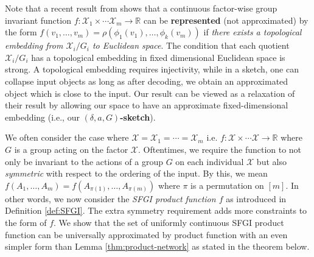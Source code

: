 \documentclass[12pt]{article}
\newcommand{\R}{\mathbb R}
\newcommand{\samedit}[1]{{{\textcolor{darkblue}{#1}}}}
\newcommand{\SFGI} {{SFGI}}
\begin{document}
Note that a recent result from \citep{lim2022sign} shows that a continuous factor-wise group invariant function $f: \mathcal{X}_1 \times \cdots \mathcal{X}_m \to \R$ can be {\bf represented} (not approximated) by the form $f(v_1, \dots, v_m) = \rho(\phi_1(v_1), \dots, \phi_k(v_m))$ if \emph{there exists a topological embedding from $\mathcal{X}_i/G_i$ to Euclidean space}. The condition that each quotient $\mathcal{X}_i/G_i$ has a topological embedding in fixed dimensional Euclidean space is strong. A topological embedding requires injectivity, while in a sketch, one can collapse input objects as long as after decoding, we obtain an approximated object which is close to the input.
Our result can be viewed as a relaxation of their result by allowing our space to have an approximate fixed-dimensional embedding (i.e., our {\bf $(\delta, a, G)$-sketch}). 

We often consider the case where $\mathcal{X} = \mathcal{X}_1 =  \cdots = \mathcal{X}_m$ i.e. $f: \mathcal{X} \times \cdots \mathcal{X} \to \R$ where $G$ is a group acting on the factor $\mathcal{X}$. 
Oftentimes, we require the function to not only be invariant to the actions of a group $G$ on each individual $\mathcal{X}$ but also \emph{symmetric} with respect to the ordering of the input. 
By this, we mean $f(A_1, \dots, A_m) = f(A_{\pi(1)}, \dots, A_{\pi(m)})$ where $\pi$ is a permutation on $[m]$. 
In other words, we now consider the \emph{\SFGI{} product function $f$} as introduced in Definition \ref{def:SFGI}. 
The extra symmetry requirement adds more constraints to the form of $f$.
We show that the set of uniformly continuous \SFGI{} product function can be universally approximated by product function with an even simpler form than Lemma \ref{thm:product-network} as stated in the theorem below.

\end{document}
